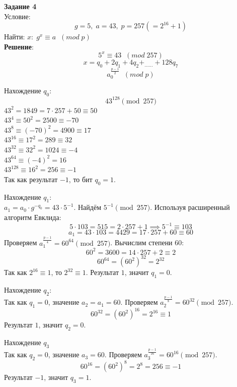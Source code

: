 \documentclass[12pt]{article}
\begin{document}
\begin{flushleft}
    \textbf{Задание 4} \\
    Условие: \\
    \[g=5, \; a=43, \; p = 257(=2^16 + 1) \]
    Найти: $ x: \; g^x \equiv a \; \; (mod \; p) $ \\
    
    \vspace{20pt}
    \textbf{Решение}: \\
    \[5^x \equiv 43 \; \; (mod \; 257) \]
    \[ x = q_0 + 2q_1 + 4q_2 + _{\dots \dots} + 128q_7 \]
    \[ a_0^{\frac{p-1}{2}} \; \; (mod \; p) \]

    \vspace{20pt}
    Нахождение $q_0$: \\
    \[ 43^{128} \pmod{257} \]
    $43^2 = 1849 = 7 \cdot 257 + 50 \equiv 50 $\\
    $43^4 \equiv 50^2 = 2500 \equiv -70$ \\
    $43^8 \equiv (-70)^2 = 4900 \equiv 17$ \\
    $43^{16} \equiv 17^2 = 289 \equiv 32$ \\
    $43^{32} \equiv 32^2 = 1024 \equiv -4$ \\
    $43^{64} \equiv (-4)^2 = 16$ \\
    $43^{128} \equiv 16^2 = 256 \equiv -1$ \\
    Так как результат $-1$, то бит \textbf{$q_0 = 1$}.

    \vspace{20pt}
    Нахождение $q_1$: \\
    $a_1 = a_0 \cdot g^{-q_0} = 43 \cdot 5^{-1}$.
    Найдём $5^{-1} \pmod{257}$. Используя расширенный алгоритм Евклида:
    \[ 5 \cdot 103 = 515 = 2 \cdot 257 + 1 \implies 5^{-1} \equiv 103 \]
    \[ a_1 = 43 \cdot 103 = 4429 = 17 \cdot 257 + 60 \equiv 60 \]
    Проверяем $a_1^{\frac{p-1}{4}} = 60^{64} \pmod{257}$.
    Вычислим степени 60:
    \[ 60^2 = 3600 = 14 \cdot 257 + 2 \equiv 2\]
    \[60^{64} = (60^2)^{32} = 2^{32}\]
    Так как $2^{16} \equiv 1$, то $2^{32} \equiv 1$. Результат $1$, значит \textbf{$q_1 = 0$}.

    \vspace{20pt}
    Нахождение $q_2$: \\
    Так как $q_1=0$, значение $a_2 = a_1 = 60$.
    Проверяем $a_2^{\frac{p-1}{8}} = 60^{32} \pmod{257}$.
    \[60^{32} = (60^2)^{16} = 2^{16} \equiv 1 \]
    Результат $1$, значит \textbf{$q_2 = 0$}.

    \vspace{20pt}
    Нахождение $q_3$ \\
    Так как $q_2=0$, значение $a_3 = 60$.
    Проверяем $a_3^{\frac{p-1}{16}} = 60^{16} \pmod{257}$.
    \[60^{16} = (60^2)^{8} = 2^8 = 256 \equiv -1\]
    Результат $-1$, значит \textbf{$q_3 = 1$}.


\end{flushleft}
\end{document}
